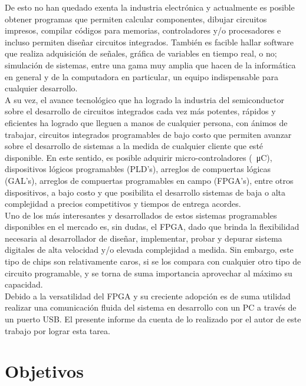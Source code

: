 De esto no han quedado exenta la industria electrónica y actualmente es posible
obtener programas que permiten calcular componentes, dibujar circuitos impresos,
compilar códigos para memorias, controladores y/o procesadores e incluso
permiten diseñar circuitos integrados. También es facible hallar software que
realiza adquisición de señales, gráfica de variables en tiempo real, o no;
simulación de sistemas, entre una gama muy amplia que hacen de la informática en
general y de la computadora en particular, un equipo indispensable para
cualquier desarrollo.\\

A su vez, el avance tecnológico que ha logrado la industria del semiconductor
sobre el desarrollo de circuitos integrados cada vez más potentes, rápidos y
eficientes ha logrado que lleguen a manos de cualquier persona, con ánimos de
trabajar, circuitos integrados programables de bajo costo que permiten avanzar
sobre el desarrollo de sistemas a la medida de cualquier cliente que esté
disponible. En este sentido, es posible adquirir micro-controladores
(\SI{}{\micro C}), dispositivos lógicos programables (PLD's), arreglos de
compuertas lógicas (GAL's), arreglos de compuertas programables
en campo (FPGA's), entre otros dispositivos, a bajo costo y que posibilita el
desarrollo sistemas de baja o alta complejidad a precios competitivos y tiempos
de entrega acordes.\\

Uno de los más interesantes y desarrollados de estos sistemas programables
disponibles en el mercado es, sin dudas, el FPGA, dado que brinda la
flexibilidad necesaria al desarrollador de diseñar, implementar, probar y
depurar sistema digitales de alta velocidad y/o elevada complejidad a medida.
Sin embargo, este tipo de chips son relativamente caros, si se los compara
con cualquier otro tipo de circuito programable, y se torna de suma importancia
aprovechar al máximo su capacidad.\\

Debido a la versatilidad del FPGA y su creciente adopción es de suma utilidad
realizar una comunicación fluida del sistema en desarrollo con un PC a través de
un puerto USB. El presente informe da cuenta de lo realizado por el autor de
este trabajo por lograr esta tarea.\\

  \section{Objetivos}
